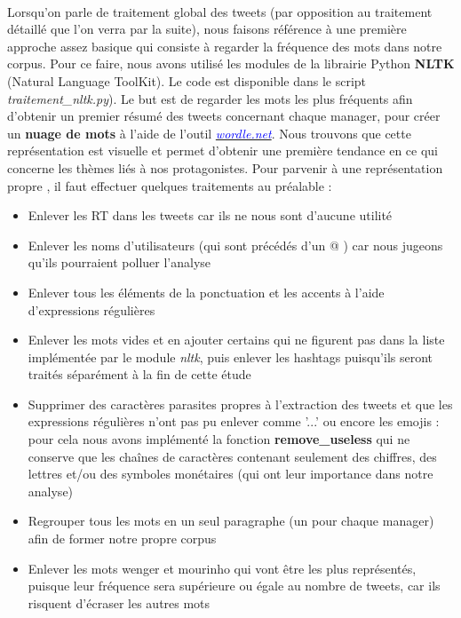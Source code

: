 \documentclass[14pt, openany]{article}
\begin{document}
\paragraph{}
Lorsqu'on parle de traitement global des tweets (par opposition au traitement détaillé que l'on verra par la suite), nous faisons référence à une première approche assez basique qui consiste à regarder la fréquence des mots dans notre corpus. Pour ce faire, nous avons utilisé les modules de la librairie Python \textbf{NLTK} (Natural Language ToolKit). Le code est disponible dans le script \textit{traitement\_nltk.py}). Le but est de regarder les mots les plus fréquents afin d'obtenir un premier résumé des tweets concernant chaque manager, pour créer un \textbf{nuage de mots} à l'aide de l'outil \href{http://www.wordle.net/}{\textit{\textcolor{blue}{wordle.net}}}. Nous trouvons que cette représentation est visuelle et permet d'obtenir une première tendance en ce qui concerne les thèmes liés à nos protagonistes. Pour parvenir à une représentation \og propre \fg{}, il faut effectuer quelques traitements au préalable :
\begin{itemize}
\item Enlever les \og RT \fg{} dans les tweets car ils ne nous sont d'aucune utilité 
\item Enlever les noms d'utilisateurs (qui sont précédés d'un \og @ \fg{}) car nous jugeons qu'ils pourraient polluer l'analyse
\item Enlever tous les éléments de la ponctuation et les accents à l'aide d'expressions régulières
\item Enlever les mots vides et en ajouter certains qui ne figurent pas dans la liste implémentée par le module \textit{nltk}, puis enlever les hashtags puisqu'ils seront traités séparément à la fin de cette étude
\item Supprimer des caractères \og parasites \fg{} propres à l'extraction des tweets et que les expressions régulières n'ont pas pu enlever comme '...' ou encore les emojis : pour cela nous avons implémenté la fonction \textbf{remove\_useless} qui ne conserve que les chaînes de caractères contenant seulement des chiffres, des lettres et/ou des symboles monétaires (qui ont leur importance dans notre analyse)
\item Regrouper tous les mots en un seul paragraphe (un pour chaque manager) afin de former notre propre corpus
\item Enlever les mots \og wenger \fg{} et \og mourinho \fg{} qui vont être les plus représentés, puisque leur fréquence sera supérieure ou égale au nombre de tweets, car ils risquent d'écraser les autres mots
\end{itemize}
\end{document}
